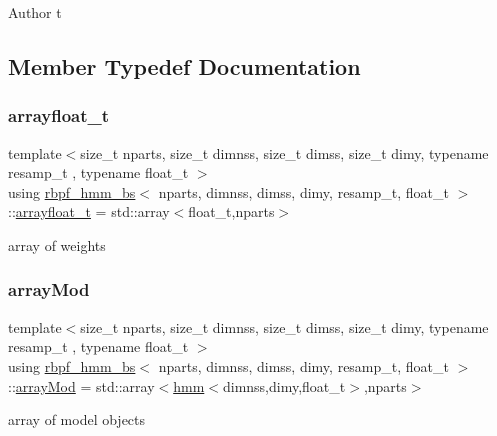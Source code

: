 \begin{DoxyAuthor}{Author}
t 
\end{DoxyAuthor}


\subsection{Member Typedef Documentation}
\mbox{\label{classrbpf__hmm__bs_aa2dd927bb65838210f0d177b360606dc}} 
\subsubsection{\texorpdfstring{arrayfloat\+\_\+t}{arrayfloat\_t}}
{\footnotesize\ttfamily template$<$size\+\_\+t nparts, size\+\_\+t dimnss, size\+\_\+t dimss, size\+\_\+t dimy, typename resamp\+\_\+t , typename float\+\_\+t $>$ \\
using \hyperlink{classrbpf__hmm__bs}{rbpf\+\_\+hmm\+\_\+bs}$<$ nparts, dimnss, dimss, dimy, resamp\+\_\+t, float\+\_\+t $>$\+::\hyperlink{classrbpf__hmm__bs_aa2dd927bb65838210f0d177b360606dc}{arrayfloat\+\_\+t} =  std\+::array$<$float\+\_\+t,nparts$>$}

array of weights \mbox{\label{classrbpf__hmm__bs_aa91b72fcbb93f89eade623504eaac11b}} 
\subsubsection{\texorpdfstring{array\+Mod}{arrayMod}}
{\footnotesize\ttfamily template$<$size\+\_\+t nparts, size\+\_\+t dimnss, size\+\_\+t dimss, size\+\_\+t dimy, typename resamp\+\_\+t , typename float\+\_\+t $>$ \\
using \hyperlink{classrbpf__hmm__bs}{rbpf\+\_\+hmm\+\_\+bs}$<$ nparts, dimnss, dimss, dimy, resamp\+\_\+t, float\+\_\+t $>$\+::\hyperlink{classrbpf__hmm__bs_aa91b72fcbb93f89eade623504eaac11b}{array\+Mod} =  std\+::array$<$\hyperlink{classhmm}{hmm}$<$dimnss,dimy,float\+\_\+t$>$,nparts$>$}

array of model objects \mbox{\label{classrbpf__hmm__bs_a073f5b7f5015d394259510b20f693a19}} 
